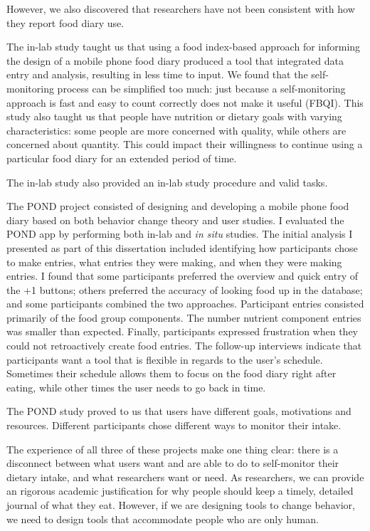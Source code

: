 However, we also discovered that researchers have not been consistent with how they report food diary use. 

The in-lab study taught us that using a food index-based approach for informing the design of a mobile phone food diary produced a tool that integrated data entry and analysis, resulting in less time to input. We found that the self-monitoring process can be simplified too much: just because a self-monitoring approach is fast and easy to count correctly does not make it useful (FBQI). This study also taught us that people have nutrition or dietary goals with varying characteristics: some people are more concerned with quality, while others are concerned about quantity. This could impact their willingness to continue using a particular food diary for an extended period of time. 

The in-lab study also provided an in-lab study procedure and valid tasks. 

The POND project consisted of designing and developing a mobile phone food diary based on both behavior change theory and user studies. I evaluated the POND app by performing both in-lab and \textit{in situ} studies. The initial analysis I presented as part of this dissertation included identifying how participants chose to make entries, what entries they were making, and when they were making entries. I found that some participants preferred the overview and quick entry of the +1 buttons; others preferred the accuracy of looking food up in the database; and some participants combined the two approaches. Participant entries consisted primarily of the food group components. The number nutrient component entries was smaller than expected. Finally, participants expressed frustration when they could not retroactively create food entries. The follow-up interviews indicate that participants want a tool that is flexible in regards to the user's schedule. Sometimes their schedule allows them to focus on the food diary right after eating, while other times the user needs to go back in time. 

The POND study proved to us that users have different goals, motivations and resources. Different participants chose different ways to monitor their intake. 

The experience of all three of these projects make one thing clear: there is a disconnect between what users want and are able to do to self-monitor their dietary intake, and what researchers want or need. As researchers, we can provide an rigorous academic justification for why people should keep a timely, detailed journal of what they eat. However, if we are designing tools to change behavior, we need to design tools that accommodate people who are only human. 

